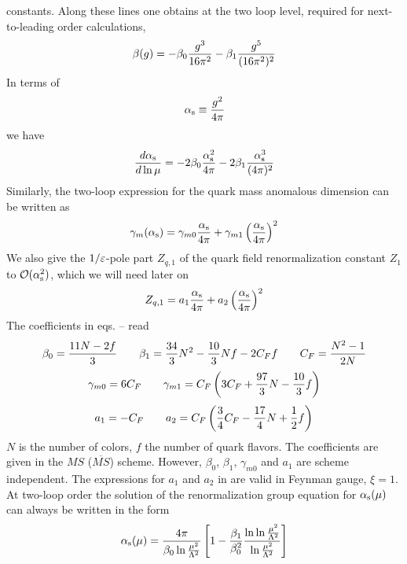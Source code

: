 constants. Along these lines one obtains at the two loop level,
required for next-to-leading order calculations,
\begin{equation}\label{bg01}
\beta(g)=-\beta_0{g^3\over 16\pi^2}-\beta_1{g^5\over (16\pi^2)^2}  \end{equation}
In terms of
\begin{equation}\label{aasg} \alpha_{\rm s}\equiv{g^2\over 4\pi}  \end{equation}
we have
\begin{equation}\label{rga}
{d\alpha_{\rm s}\over d\ln\mu}=-2\beta_0 {\alpha_{\rm s}^2\over 4\pi}-2\beta_1
  {\alpha_{\rm s}^3\over(4\pi)^2}  \end{equation}
Similarly, the two-loop expression for the quark mass anomalous
dimension can be written as
\begin{equation}\label{gama}
\gamma_m(\alpha_{\rm s})=\gamma_{m0}\frac{\alpha_{\rm s}}{4 \pi} + \gamma_{m1}\left(\frac{\alpha_{\rm s}}{4 \pi}\right)^2
\end{equation}
We also give the $1/\varepsilon$-pole part $Z_{q, 1}$ of the quark field
renormalization constant $Z_1$ to ${\cal O}(\alpha_{\rm s}^2)$, which we will need
later on
\begin{equation}\label{zq1a} Z_{q, 1}=a_1\frac{\alpha_{\rm s}}{4 \pi} + a_2\left(\frac{\alpha_{\rm s}}{4 \pi}\right)^2
\end{equation}
The coefficients in eqs.  --  read
\begin{equation}\label{b0b1}
\beta_0={{11N-2f}\over 3}\qquad
\beta_1={34\over 3}N^2-{10\over 3}Nf-2C_F f\qquad
C_F={{N^2-1}\over{2N}}\end{equation}
\begin{equation}\label{gm01} \gamma_{m0}=6C_F\qquad \gamma_{m1}=C_F\left(
     3C_F+{97\over 3}N-{10\over 3}f\right)  \end{equation}
\begin{equation}\label{a1a2} a_1=-C_F\qquad a_2=C_F\left(
     {3\over 4}C_F-{17\over 4}N+{1\over 2}f\right)  \end{equation}
$N$ is the number of colors, $f$ the number of quark flavors. The
coefficients are given in the $MS$ ($\overline{MS}$) scheme.
However, $\beta_0$, $\beta_1$, $\gamma_{m0}$ and $a_1$ are scheme
independent. The expressions for $a_1$ and $a_2$ in  are
valid in Feynman gauge, $\xi=1$.\\
At two-loop order the solution of the renormalization group equation
 for $\alpha_{\rm s}(\mu)$ can always be written in the form
\begin{equation}\label{amu}
\alpha_{\rm s}(\mu)={4\pi\over{\beta_0\ln{{\mu^2}\over{\Lambda^2}}}} \left[1-
 {{\beta_1}\over{\beta_0^2}}{{\ln\ln{{\mu^2}\over{\Lambda^2}}}\over
    {\ln{{\mu^2}\over{\Lambda^2}}}}\right] \end{equation}
